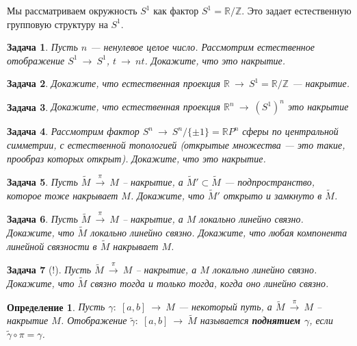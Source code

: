 \documentclass[12pt]{book}
\newcommand{\arrow}{{\:\longrightarrow\:}}
\def\Z{{\mathbb Z}}
\def\R{{\mathbb R}}
\theoremstyle{upshape}
\newtheorem{zadacha}{Задача}[chapter]
\theoremstyle{generic}
\newtheorem{opredelenie}[teorema]{Определение}
\theoremstyle{upshapenonumber}
\newcommand{\следствие}{%
     \refstepcounter{teorema}
     {\noindent\bf Следствие \thechapter.\arabic{teorema}:\ }}
\newcommand{\пример}{%
     \refstepcounter{teorema}
     {\noindent\bf Пример \thechapter.\arabic{teorema}:\ }}
\newcommand{\лемма}{%
     \refstepcounter{teorema}
     {\noindent\bf Лемма \thechapter.\arabic{teorema}:\ }}
\newcommand{\теорема}{%
     \refstepcounter{teorema}
     {\noindent\bf Теорема \thechapter.\arabic{teorema}:\ }}
\newcommand{\утверждение}{%
     \refstepcounter{teorema}
     {\noindent\bf Утверждение \thechapter.\arabic{teorema}:\ }}
\begin{document}
{Мы рассматриваем окружность
$S^1$ как фактор $S^1 = \R/\Z$.
Это задает естественную групповую структуру на $S^1$.

\begin{zadacha} 
Пусть $n$ --- ненулевое целое число.
Рассмотрим естественное
отображение $S^1 \arrow S^1$, $t \arrow nt$.
Докажите, что это накрытие.
\end{zadacha}

\begin{zadacha} 
Докажите, что естественная проекция
$\R \arrow  S^1 = \R/\Z$ --- накрытие.
\end{zadacha}

\begin{zadacha}
Докажите, что естественная проекция
$\R^n \arrow (S^1)^n$ это накрытие
\end{zadacha}

\begin{zadacha} 
Рассмотрим фактор
$S^n \arrow S^n/\{\pm 1\}= \R P^n$
сферы по центральной симметрии, с 
естественной топологией (открытые множества --- 
это такие, прообраз которых открыт). Докажите, что
это накрытие.
\end{zadacha}

\begin{zadacha}
Пусть $\tilde M \stackrel \pi \arrow M$ --
накрытие, а $\tilde M'\subset \tilde M$ --- подпространство,
которое тоже накрывает $M$. Докажите, что
$\tilde M'$ открыто и замкнуто в $\tilde M$.
\end{zadacha}

\begin{zadacha}
Пусть $\tilde M \stackrel \pi \arrow M$ --
накрытие, а $M$ локально линейно связно. Докажите, что
$\tilde M$ локально линейно связно. Докажите, что 
любая компонента линейной связности в $\tilde M$
накрывает $M$.
\end{zadacha}

\begin{zadacha}[!] \label{_nakry_line_svya_Zadacha_}
Пусть $\tilde M \stackrel \pi \arrow M$ --
накрытие, а $M$ локально линейно связно. Докажите,
что $\tilde M$ связно тогда и только тогда, когда оно
линейно связно.
\end{zadacha}

\begin{opredelenie} 
Пусть $\gamma:\; [a, b] \arrow M$ --- некоторый
путь, а $\tilde M \stackrel \pi \arrow M$ --
накрытие $M$. Отображение 
$\tilde \gamma:\; [a, b] \arrow \tilde M$
называется {\bf поднятием $\gamma$}, если
$\tilde \gamma\circ \pi = \gamma$.
\end{opredelenie}

}
\end{document}
